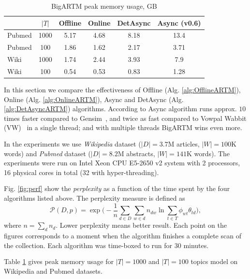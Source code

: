 \documentclass[russian,english]{llncs}
\newcommand{\kw}[1]{\mbox{\textsf{#1}}}
\begin{document}
\begin{table}[t]
	\caption{
		BigARTM peak memory usage, GB
	}
	\label{tab:memory}
	\centering\tabcolsep=4.3pt
	\begin{tabular}[t]{|l|ccccc|}
		\hline
		& $|T|$ & Offline   & Online    & DetAsync     & Async (\kw{v0.6})  \\
		\hline
		Pubmed & {1000}	& {5.17}   	& {4.68}   	& {8.18}   	& {13.4}      \\
		Pubmed & {100}	& {1.86}   	& {1.62}   	& {2.17}   	& {3.71}      \\
		Wiki   & {1000}	& {1.74}   	& {2.44}   	& {3.93}   	& {7.9}       \\ 
		Wiki   & {100}	& {0.54}   	& {0.53}   	& {0.83}   	& {1.28}       \\ 
		\hline
	\end{tabular}
\end{table}

In this section we compare the effectiveness of
\kw{Offline} (Alg. \ref{alg:OfflineARTM}),
\kw{Online} (Alg. \ref{alg:OnlineARTM}),
\kw{Async} \cite{vfardi15aist} and
\kw{DetAsync} (Alg. \ref{alg:DetAsyncARTM}) algorithms.
According to \cite{vfardi15aist} \kw{Async} algorithm
runs approx. $10$ times faster compared to Gensim~\cite{rehurek10software},
and twice as fast compared to
Vowpal Wabbit (VW)~\cite{langford07vw}
in a single thread;
and with multiple threads BigARTM wins even more.

In the experiments we use \emph{Wikipedia} dataset ($|D| = 3.7$M articles, $|W| = 100$K words)
and \emph{Pubmed} dataset ($|D| = 8.2$M abstracts, $|W| = 141$K words).
The experiments were run on Intel Xeon CPU E5-2650 v2 system with 2 processors, 16 physical cores in total (32 with hyper-threading).


Fig. \ref{fig:perf} show the \emph{perplexity} as a function of the time spent by the four algorithms listed above.
The perplexity measure is defined as
\begin{equation}
\label{eq:perplexity}
\mathscr{P}(D, p) =
\exp \biggl( - \frac{1}{n} \sum_{d \in D} \sum_{w \in d} n_{dw} \ln \sum_{t\in T} \phi_{wt} \theta_{td} \biggr),
\end{equation}
 where $n = \sum_d n_d$. Lower perplexity means better result.
Each point on the figures corresponds to a moment when the algorithm finishes a complete scan of the collection.
Each algorithm was time-boxed to run for $30$ minutes.

Table \ref{tab:memory} gives peak memory usage for $|T| = 1000$ and $|T|=100$ topics model on Wikipedia and Pubmed datasets.
\end{document}
